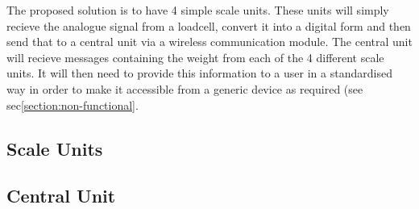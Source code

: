The proposed solution is to have 4 simple scale units. These units will simply recieve the analogue signal from a loadcell, convert it into a digital form and then send that to a central unit via a wireless communication module. The central unit will recieve messages containing the weight from each of the 4 different scale units. It will then need to provide this information to a user in a standardised way in order to make it accessible from a generic device as required (see sec\ref{section:non-functional}. 

\subsection{Scale Units}
\label{scale}

\subsection{Central Unit}
\label{central}


\label{Block Diagram}